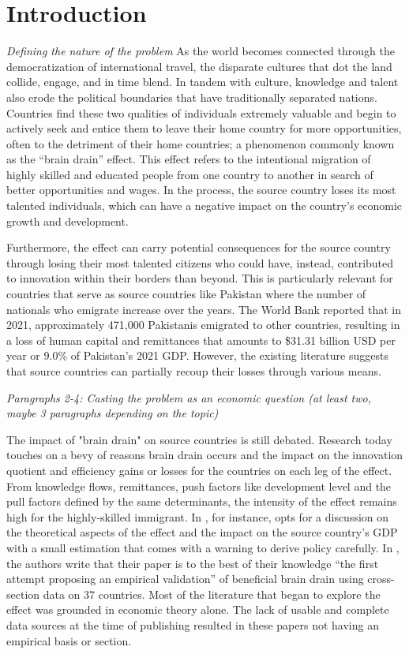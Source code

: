 \documentclass[12pt]{article}
\newcommand{\pointer}[1]{{\color{red} \center \textit{#1}}}
\begin{document}
\section{Introduction}
\pointer{Defining the nature of the problem}
As the world becomes connected through the democratization of international travel, the disparate cultures that dot the land collide, engage, and in time blend.
In tandem with culture, knowledge and talent also erode the political boundaries that have traditionally separated nations.
Countries find these two qualities of individuals extremely valuable and begin to actively seek and entice them to leave their home country for more opportunities, often to the detriment of their home countries; a phenomenon commonly known as the “brain drain” effect.
This effect refers to the intentional migration of highly skilled and educated people from one country to another in search of better opportunities and wages.
In the process, the source country loses its most talented individuals, which can have a negative impact on the country's economic growth and development.

Furthermore, the effect can carry potential consequences for the source country through losing their most talented citizens who could have, instead, contributed to innovation within their borders than beyond.
This is particularly relevant for countries that serve as source countries like Pakistan where the number of nationals who emigrate increase over the years.
The World Bank reported that in 2021, approximately 471,000 Pakistanis emigrated to other countries, resulting in a loss of human capital and remittances that amounts to \$31.31 billion USD per year or 9.0\% of Pakistan's 2021 GDP. 
However, the existing literature suggests that source countries can partially recoup their losses through various means.

\pointer{Paragraphs 2-4: Casting the problem as an economic question (at least two, maybe 3 paragraphs depending on the topic)}

The impact of "brain drain" on source countries is still debated.
Research today touches on a bevy of reasons brain drain occurs and the impact on the innovation quotient and efficiency gains or losses for the countries on each leg of the effect.
From knowledge flows, remittances, push factors like development level and the pull factors defined by the same determinants, the intensity of the effect remains high for the highly-skilled immigrant.
In \cite{hall_brain_2005}, for instance, opts for a discussion on the theoretical aspects of the effect and the impact on the source country's GDP with a small estimation that comes with a warning to derive policy carefully. In \citeauthor{beine_brain_2001}, the authors write that their paper is to the best of their knowledge ``the first attempt proposing an empirical validation'' of beneficial brain drain using cross-section data on 37 countries.
Most of the literature that began to explore the effect was grounded in economic theory alone.
The lack of usable and complete data sources at the time of publishing resulted in these papers not having an empirical basis or section.
\end{document}
